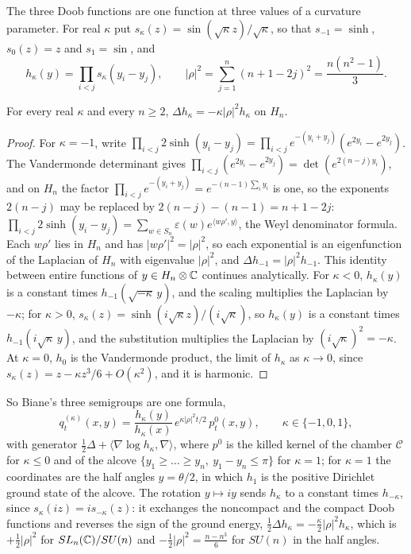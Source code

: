 The three Doob functions are one function at three values of a curvature parameter. For real $\kappa$ put $s_\kappa(z)=\sin(\sqrt\kappa z)/\sqrt\kappa$, so that $s_{-1}=\sinh$, $s_0(z)=z$ and $s_1=\sin$, and
\[
h_\kappa(y)=\prod_{i<j}s_\kappa(y_i-y_j),\qquad|\rho|^2=\sum_{j=1}^n(n+1-2j)^2=\frac{n(n^2-1)}3 .
\]

\begin{proposition}\label{prop:biane:curv}
For every real $\kappa$ and every $n\ge2$, $\Delta h_\kappa=-\kappa|\rho|^2h_\kappa$ on $H_n$.
\end{proposition}

\begin{proof}
For $\kappa=-1$, write $\prod_{i<j}2\sinh(y_i-y_j)=\prod_{i<j}e^{-(y_i+y_j)}(e^{2y_i}-e^{2y_j})$. The Vandermonde determinant gives $\prod_{i<j}(e^{2y_i}-e^{2y_j})=\det(e^{2(n-j)y_i})$, and on $H_n$ the factor $\prod_{i<j}e^{-(y_i+y_j)}=e^{-(n-1)\sum_iy_i}$ is one, so the exponents $2(n-j)$ may be replaced by $2(n-j)-(n-1)=n+1-2j$: $\prod_{i<j}2\sinh(y_i-y_j)=\sum_{w\in S_n}\varepsilon(w)e^{\langle w\rho',y\rangle}$, the Weyl denominator formula. Each $w\rho'$ lies in $H_n$ and has $|w\rho'|^2=|\rho|^2$, so each exponential is an eigenfunction of the Laplacian of $H_n$ with eigenvalue $|\rho|^2$, and $\Delta h_{-1}=|\rho|^2h_{-1}$. This identity between entire functions of $y\in H_n\otimes\mathbb{C}$ continues analytically. For $\kappa<0$, $h_\kappa(y)$ is a constant times $h_{-1}(\sqrt{-\kappa}\,y)$, and the scaling multiplies the Laplacian by $-\kappa$; for $\kappa>0$, $s_\kappa(z)=\sinh(i\sqrt\kappa z)/(i\sqrt\kappa)$, so $h_\kappa(y)$ is a constant times $h_{-1}(i\sqrt\kappa\,y)$, and the substitution multiplies the Laplacian by $(i\sqrt\kappa)^2=-\kappa$. At $\kappa=0$, $h_0$ is the Vandermonde product, the limit of $h_\kappa$ as $\kappa\to0$, since $s_\kappa(z)=z-\kappa z^3/6+O(\kappa^2)$, and it is harmonic.
\end{proof}

So Biane's three semigroups are one formula,
\[
q^{(\kappa)}_t(x,y)=\frac{h_\kappa(y)}{h_\kappa(x)}\,e^{\kappa|\rho|^2t/2}\,p^{0}_t(x,y),\qquad\kappa\in\{-1,0,1\},
\]
with generator $\frac12\Delta+\langle\nabla\log h_\kappa,\nabla\rangle$, where $p^0$ is the killed kernel of the chamber $\mathcal C$ for $\kappa\le0$ and of the alcove $\{y_1\ge\dots\ge y_n,\ y_1-y_n\le\pi\}$ for $\kappa=1$; for $\kappa=1$ the coordinates are the half angles $y=\theta/2$, in which $h_1$ is the positive Dirichlet ground state of the alcove. The rotation $y\mapsto iy$ sends $h_\kappa$ to a constant times $h_{-\kappa}$, since $s_\kappa(iz)=is_{-\kappa}(z)$: it exchanges the noncompact and the compact Doob functions and reverses the sign of the ground energy, $\frac12\Delta h_\kappa=-\frac\kappa2|\rho|^2h_\kappa$, which is $+\frac12|\rho|^2$ for $SL_n(\mathbb{C})/SU(n)$ and $-\frac12|\rho|^2=\frac{n-n^3}6$ for $SU(n)$ in the half angles.

